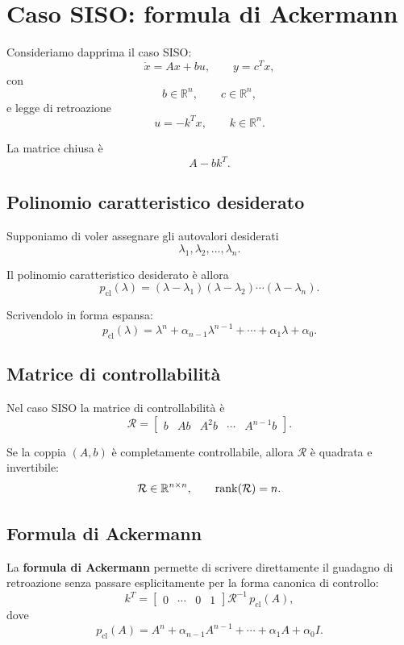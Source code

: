 \section{Caso SISO: formula di Ackermann}

Consideriamo dapprima il caso SISO:
\[
\dot x=Ax+bu,\qquad y=c^T x,
\]
con
\[
b\in\mathbb{R}^n,\qquad c\in\mathbb{R}^n,
\]
e legge di retroazione
\[
u=-k^T x,
\qquad
k\in\mathbb{R}^n.
\]

La matrice chiusa è
\[
A-bk^T.
\]

\subsection{Polinomio caratteristico desiderato}

Supponiamo di voler assegnare gli autovalori desiderati
\[
\lambda_1,\lambda_2,\dots,\lambda_n.
\]

Il polinomio caratteristico desiderato è allora
\[
p_{\text{cl}}(\lambda)=
(\lambda-\lambda_1)(\lambda-\lambda_2)\cdots(\lambda-\lambda_n).
\]

Scrivendolo in forma espansa:
\[
p_{\text{cl}}(\lambda)=
\lambda^n+\alpha_{n-1}\lambda^{n-1}+\cdots+\alpha_1\lambda+\alpha_0.
\]

\subsection{Matrice di controllabilità}

Nel caso SISO la matrice di controllabilità è
\[
\mathcal{R}=
\begin{bmatrix}
b & Ab & A^2b & \cdots & A^{n-1}b
\end{bmatrix}.
\]

Se la coppia \((A,b)\) è completamente controllabile, allora \(\mathcal{R}\) è quadrata e invertibile:
\[
\mathcal{R}\in\mathbb{R}^{n\times n},
\qquad
\rank(\mathcal{R})=n.
\]

\subsection{Formula di Ackermann}

La \textbf{formula di Ackermann} permette di scrivere direttamente il guadagno di retroazione
senza passare esplicitamente per la forma canonica di controllo:
\[
k^T=
\begin{bmatrix}
0 & \cdots & 0 & 1
\end{bmatrix}
\mathcal{R}^{-1}\,p_{\text{cl}}(A),
\]
dove
\[
p_{\text{cl}}(A)=A^n+\alpha_{n-1}A^{n-1}+\cdots+\alpha_1A+\alpha_0 I.
\]

